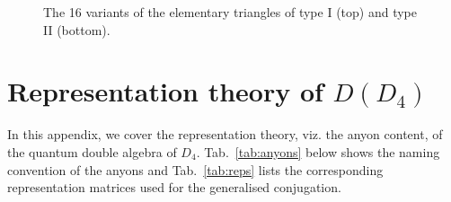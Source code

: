 \documentclass[a4paper,twocolumn,11pt]{quantumarticle}
\begin{document}
\begin{figure}
\begin{tabular}{llll}
\end{tabular}\vspace{20pt}
\caption{The 16 variants of the elementary triangles of type I (top) and type II (bottom).}
\label{fig:al_trigs}
\end{figure}



\section{Representation theory of $D(D_4)$}\label{app:reps}

In this appendix, we cover the representation theory, viz. the anyon content, of the quantum double algebra of $D_4$. Tab.~\ref{tab:anyons} below shows the naming convention of the anyons and Tab.~\ref{tab:reps} lists the corresponding representation matrices used for the generalised conjugation.
\end{document}
